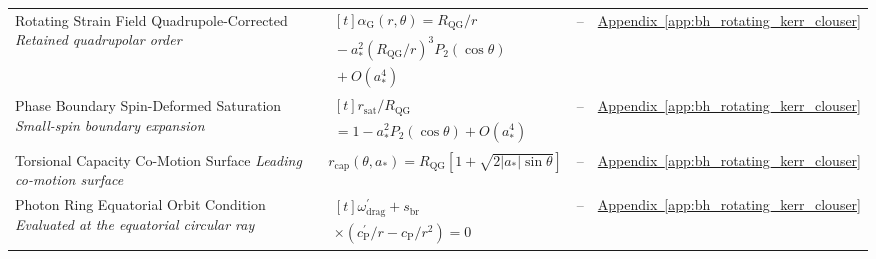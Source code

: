 \begin{longtable}{@{} p{4.5cm} p{6cm} c p{4cm} @{}}
{\raggedright Rotating Strain Field Quadrupole-Corrected \newline \textit{Retained quadrupolar order}\par} & {\raggedright $\begin{gathered}[t]\alpha_{\mathrm G}(r,\theta)=R_{\mathrm{QG}}/r \\ {}-a_*^2(R_{\mathrm{QG}}/r)^3P_2(\cos\theta) \\ {}+O(a_*^4)\end{gathered}$\par} & -- & {\raggedright \hyperref[app:bh_rotating_kerr_clouser]{Appendix~\ref*{app:bh_rotating_kerr_clouser}}\par} \\

{\raggedright Phase Boundary Spin-Deformed Saturation \newline \textit{Small-spin boundary expansion}\par} & {\raggedright $\begin{gathered}[t]r_{\mathrm{sat}}/R_{\mathrm{QG}} \\ =1-a_*^2P_2(\cos\theta)+O(a_*^4)\end{gathered}$\par} & -- & {\raggedright \hyperref[app:bh_rotating_kerr_clouser]{Appendix~\ref*{app:bh_rotating_kerr_clouser}}\par} \\

{\raggedright Torsional Capacity Co-Motion Surface \newline \textit{Leading co-motion surface}\par} & {\raggedright $r_{\mathrm{cap}}(\theta,a_\ast) = R_{\mathrm{QG}} \left[ 1+\sqrt{2|a_\ast|\sin\theta} \right]$\par} & -- & {\raggedright \hyperref[app:bh_rotating_kerr_clouser]{Appendix~\ref*{app:bh_rotating_kerr_clouser}}\par} \\

{\raggedright Photon Ring Equatorial Orbit Condition \newline \textit{Evaluated at the equatorial circular ray}\par} & {\raggedright $\begin{gathered}[t]\omega_{\mathrm{drag}}^\prime+s_{\mathrm{br}} \\ \times\left(c_{\mathrm P}^\prime/r-c_{\mathrm P}/r^2\right)=0\end{gathered}$\par} & -- & {\raggedright \hyperref[app:bh_rotating_kerr_clouser]{Appendix~\ref*{app:bh_rotating_kerr_clouser}}\par} \\


\end{longtable}
